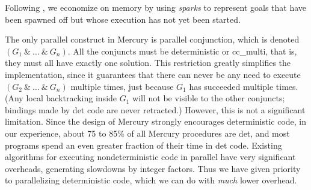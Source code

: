 Following \cite{simonmar_2009_multicore_rts},
we economize on memory by using \emph{sparks}
to represent goals that have been spawned off
but whose execution has not yet been started.

The only parallel construct in Mercury is parallel conjunction,
which is denoted $(G_1~\&~\ldots~\&~G_n)$.
All the conjuncts must be deterministic or cc\_multi,
that is, they must all have exactly one solution.
This restriction greatly simplifies the implementation,
since it guarantees that there can never be any need
to execute $(G_2~\&~\ldots~\&~G_n)$ multiple times,
just because $G_1$ has succeeded multiple times.
(Any local backtracking inside $G_1$ will not be visible to the other conjuncts;
bindings made by det code are never retracted.)
However, this is not a significant limitation.
Since the design of Mercury strongly encourages deterministic code,
in our experience, about 75 to 85\% of all Mercury procedures are det,
and most programs spend an even greater fraction of their time in det code.
Existing algorithms for executing nondeterministic code in parallel
have very significant overheads, generating slowdowns by integer factors.
Thus we have given priority to parallelizing deterministic code,
which we can do with \emph{much} lower overhead.

